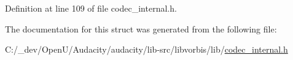 Definition at line 109 of file codec\+\_\+internal.\+h.



The documentation for this struct was generated from the following file\+:\begin{DoxyCompactItemize}
\item 
C\+:/\+\_\+dev/\+Open\+U/\+Audacity/audacity/lib-\/src/libvorbis/lib/\hyperlink{codec__internal_8h}{codec\+\_\+internal.\+h}\end{DoxyCompactItemize}
